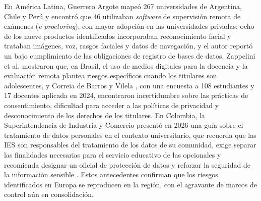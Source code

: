 En América Latina, Guerrero Argote \cite{guerrero2021proctoring} mapeó 267 universidades de Argentina, Chile y Perú y encontró que 46 utilizaban \textit{software} de supervisión remota de exámenes (\textit{e-proctoring}), con mayor adopción en las universidades privadas; ocho de los nueve productos identificados incorporaban reconocimiento facial y trataban imágenes, voz, rasgos faciales y datos de navegación, y el autor reportó un bajo cumplimiento de las obligaciones de registro de bases de datos. Zappelini et al. \cite{zappelini2023lgpd} mostraron que, en Brasil, el uso de medios digitales para la docencia y la evaluación remota plantea riesgos específicos cuando los titulares son adolescentes, y Correia de Barros y Vilela \cite{correia2025privacy}, con una encuesta a 108 estudiantes y 17 docentes aplicada en 2024, encontraron incertidumbre sobre las prácticas de consentimiento, dificultad para acceder a las políticas de privacidad y desconocimiento de los derechos de los titulares. En Colombia, la Superintendencia de Industria y Comercio presentó en 2026 una guía sobre el tratamiento de datos personales en el contexto universitario, que recuerda que las IES son responsables del tratamiento de los datos de su comunidad, exige separar las finalidades necesarias para el servicio educativo de las opcionales y recomienda designar un oficial de protección de datos y reforzar la seguridad de la información sensible \cite{sic2026universidades}. Estos antecedentes confirman que los riesgos identificados en Europa se reproducen en la región, con el agravante de marcos de control aún en consolidación.

